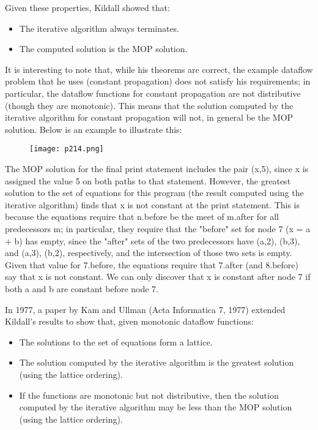 Given these properties, Kildall showed that:
\begin{itemize}
	\item The iterative algorithm always terminates.
	\item The computed solution is the MOP solution.

\end{itemize}
It is interesting to note that, while his theorems are correct,
the example dataflow problem that he uses (constant propagation)
does not satisfy his requirements; in particular, the dataflow functions for
constant propagation are not distributive (though they are monotonic).
This means that the solution computed by the iterative algorithm for constant
propagation will not, in general be the MOP solution. Below is an example to
illustrate this:


\begin{figure}[H]
	\centering
	\texttt{[image: p214.png]}
	\caption{}
	\label{fig:p214}
\end{figure}


The MOP solution for the final print statement includes the pair (x,5),
since x is assigned the value 5 on both paths to that statement. However,
the greatest solution to the set of equations for this program (the result
computed using the iterative algorithm) finds that x is not constant at the
print statement. This is because the equations require that n.before be the
meet of m.after for all predecessors m; in particular, they require that
the "before" set for node 7 (x = a + b) has empty, since the "after" sets
of the two predecessors have (a,2), (b,3), and (a,3), (b,2), respectively,
and the intersection of those two sets is empty. Given that value for
7.before, the equations require that 7.after (and 8.before) say that
x is not constant. We can only discover that x is constant after node 7
if both a and b are constant before node 7.




In 1977, a paper by Kam and Ullman (Acta Informatica 7, 1977) 
extended Kildall's results to show that, given monotonic dataflow functions:

\begin{itemize}
    \item The solutions to the set of equations form a lattice.
    \item The solution computed by the iterative algorithm is the greatest solution (using the lattice ordering).
    \item If the functions are monotonic but not distributive, then the solution computed by the iterative algorithm may be less than the MOP solution (using the lattice ordering).
\end{itemize}  



